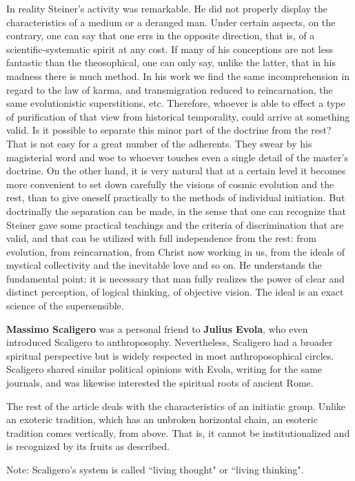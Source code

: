 \begin{quotex}
In reality Steiner's activity was remarkable. He did not properly display the characteristics of a medium or a deranged man. Under certain aspects, on the contrary, one can say that one errs in the opposite direction, that is, of a scientific-systematic spirit at any cost. If many of his conceptions are not less fantastic than the theosophical, one can only say, unlike the latter, that in his madness there is much method. In his work we find the same incomprehension in regard to the law of karma, and transmigration reduced to reincarnation, the same evolutionistic superstitions, etc. Therefore, whoever is able to effect a type of purification of that view from historical temporality, could arrive at something valid. Is it possible to separate this minor part of the doctrine from the rest? That is not easy for a great number of the adherents. They swear by his magisterial word and woe to whoever touches even a single detail of the master's doctrine. On the other hand, it is very natural that at a certain level it becomes more convenient to set down carefully the visions of cosmic evolution and the rest, than to give oneself practically to the methods of individual initiation. But doctrinally the separation can be made, in the sense that one can recognize that Steiner gave some practical teachings and the criteria of discrimination that are valid, and that can be utilized with full independence from the rest: from evolution, from reincarnation, from Christ now working in us, from the ideals of mystical collectivity and the inevitable love and so on. He understands the fundamental point: it is necessary that man fully realizes the power of clear and distinct perception, of logical thinking, of objective vision. The ideal is an exact science of the supersensible. 

\end{quotex}

\hfill

\begin{quotex}
\textbf{Massimo Scaligero} was a personal friend to \textbf{Julius Evola}, who even introduced Scaligero to anthroposophy. Nevertheless, Scaligero had a broader spiritual perspective but is widely respected in most anthroposophical circles. Scaligero shared similar political opinions with Evola, writing for the same journals, and was likewise interested the spiritual roots of ancient Rome.

The rest of the article deals with the characteristics of an initiatic group. Unlike an exoteric tradition, which has an unbroken horizontal chain, an esoteric tradition comes vertically, from above. That is, it cannot be institutionalized and is recognized by its fruits as described.

Note: Scaligero's system is called ``living thought" or ``living thinking". 

\end{quotex}
